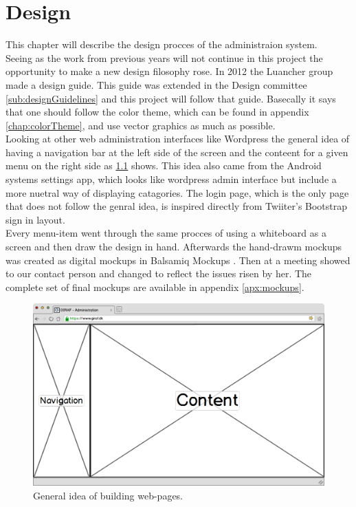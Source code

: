 \chapter{Design}
\label{chp:design}
This chapter will describe the design procces of the administraion system.\\
Seeing as the work from previous years will not continue in this project the opportunity to make a new design filosophy rose. 
In 2012 the Luancher group made a design guide. This guide was extended in the Design committee \ref{sub:designGuidelines} and this project will follow that guide. Basecally it says that one should follow the color theme, which can be found in appendix \ref{chap:colorTheme}, and use vector graphics as much as possible. \\
Looking at other web administration interfaces like Wordpress the general idea of having a navigation bar at the left side of the screen and the conteent for a given menu on the right side as \ref{fig:ideaWep} shows. This idea also came from the Android systems settings app, which looks like wordpress admin interface but include a more nuetral way of displaying catagories. The login page, which is the only page that does not follow the genral idea, is inspired directly from Twiiter's  Bootstrap sign in layout.\\ 
Every menu-item went through the same procces of using a whiteboard as a screen and then draw the design in hand. Afterwards the hand-drawm mockups was  created as digital mockups in Balsamiq Mockups . Then at a meeting showed to our contact person and changed to reflect the issues risen by her. The complete set of final mockups are available in appendix \ref{apx:mockups}.\\

\begin{figure}[!h]
\centering
\includegraphics[width=1\textwidth]{images/mockup/displayMode.png}
\caption{General idea of building web-pages.}
\label{fig:ideaWep}
\end{figure}


